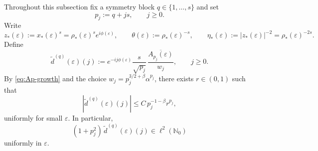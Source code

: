 \documentclass[11pt]{amsart}
\numberwithin{equation}{section}
\theoremstyle{plain}
\theoremstyle{definition}
\theoremstyle{remark}
\begin{document}
Throughout this subsection fix a symmetry block \(q\in\{1,\dots,s\}\) and set
\[
p_j:=q+js,\qquad j\ge0.
\]
Write
\[
z_*(\varepsilon):=x_*(\varepsilon)^s
=
\rho_*(\varepsilon)^s e^{i\phi(\varepsilon)},
\qquad
\theta(\varepsilon):=\rho_*(\varepsilon)^{-s},
\qquad
\eta_*(\varepsilon):=|z_*(\varepsilon)|^{-2}=\rho_*(\varepsilon)^{-2s}.
\]
Define
\begin{equation}\label{eq:spike-def-r1}
\widetilde d^{(q)}(\varepsilon)(j)
:=
e^{-ij\phi(\varepsilon)}
\frac{s}{\sqrt{p_j}}\,
\frac{\overline{A_{p_j}(\varepsilon)}}{w_j},
\qquad j\ge0.
\end{equation}
By \eqref{eq:Ap-growth} and the choice
\(w_j=p_j^{3/2+\beta}\alpha^{p_j}\), there exists \(r\in(0,1)\) such that
\begin{equation}\label{eq:spike-envelope-r1}
|\widetilde d^{(q)}(\varepsilon)(j)|
\le
C\,p_j^{-1-\beta}r^{p_j},
\end{equation}
uniformly for small \(\varepsilon\). In particular,
\begin{equation}\label{eq:spike-moment-r1}
(1+p_j^2)\,\widetilde d^{(q)}(\varepsilon)(j)\in\ell^2(\mathbb N_0)
\end{equation}
uniformly in \(\varepsilon\).
\end{document}
